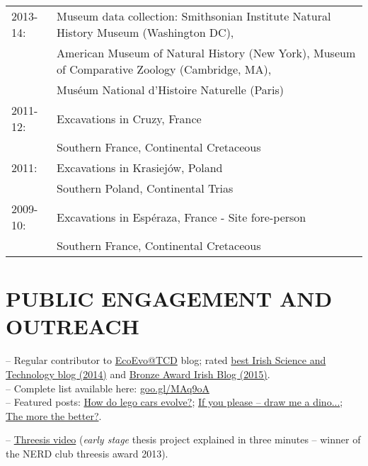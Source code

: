 \documentclass[10pt,a4paper]{article}
\begin{document}
{\begin{tabular}{ll}
2013-14: & Museum data collection: Smithsonian Institute Natural History Museum (Washington DC),\\
 & American Museum of Natural History (New York), Museum of Comparative Zoology (Cambridge, MA),\\
 & Mus\'{e}um National d'Histoire Naturelle (Paris) \\
2011-12: & Excavations in Cruzy, France \\
         & Southern France, Continental Cretaceous\\
2011: & Excavations in Krasiej\'{o}w, Poland\\
      & Southern Poland, Continental Trias\\
2009-10: & Excavations in Esp\'{e}raza, France - Site fore-person\\
         & Southern France, Continental Cretaceous\\
\end{tabular}
\bigskip

\section{PUBLIC ENGAGEMENT AND OUTREACH}
-- Regular contributor to \href{http://www.ecoevoblog.com/}{EcoEvo@TCD} blog; rated \href{http://www.ecoevoblog.com/2014/10/06/blog-awards-winners-2014/}{best Irish Science and Technology blog (2014)} and \href{http://www.blogawardsireland.com/wp-content/uploads/2015/09/Blog-Awards-Ireland-2015-Finalists-Company.pdf}{Bronze Award Irish Blog (2015)}. \\
-- Complete list available here: \href{http://tguillerme.github.io/outreach.html}{goo.gl/MAq9oA}\\
-- Featured posts: \href{http://www.ecoevoblog.com/2013/11/04/how-do-lego-cars-evolve/}{How do lego cars evolve?}; \href{http://www.ecoevoblog.com/2013/06/04/if-you-please-draw-me-a-dino/}{If you please -- draw me a dino...}; \href{http://www.ecoevoblog.com/2015/02/06/the-more-the-better/}{The more the better?}.

-- \href{http://www.youtube.com/watch?v=Y3ciaYSvbyU}{Threesis video} (\textit{early stage} thesis project explained in three minutes -- winner of the NERD club threesis award 2013).\\[1.5ex]

}
\end{document}
